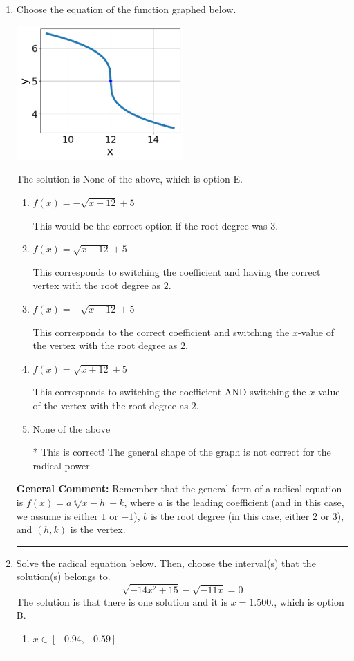 \documentclass{extbook}[14pt]
\newcommand{\litem}[1]{\item #1

\rule{\textwidth}{0.4pt}}
\begin{document}
\begin{enumerate}\litem{
Choose the equation of the function graphed below.

\begin{center}
    \includegraphics[width=0.5\textwidth]{../Figures/radicalGraphToEquationB.png}
\end{center}


The solution is \( \text{None of the above} \), which is option E.\begin{enumerate}[label=\Alph*.]
\item \( f(x) = - \sqrt{x - 12} + 5 \)

This would be the correct option if the root degree was $3$.
\item \( f(x) = \sqrt{x - 12} + 5 \)

This corresponds to switching the coefficient and having the correct vertex with the root degree as $2$.
\item \( f(x) = - \sqrt{x + 12} + 5 \)

This corresponds to the correct coefficient and switching the $x$-value of the vertex with the root degree as $2$.
\item \( f(x) = \sqrt{x + 12} + 5 \)

This corresponds to switching the coefficient AND switching the $x$-value of the vertex with the root degree as $2$.
\item \( \text{None of the above} \)

* This is correct! The general shape of the graph is not correct for the radical power.
\end{enumerate}

\textbf{General Comment:} Remember that the general form of a radical equation is $ f(x) = a \sqrt[b]{x - h} + k$, where $a$ is the leading coefficient (and in this case, we assume is either $1$ or $-1$), $b$ is the root degree (in this case, either $2$ or $3$), and $(h, k)$ is the vertex.
}
\litem{
Solve the radical equation below. Then, choose the interval(s) that the solution(s) belongs to.
\[ \sqrt{-14 x^2 + 15} - \sqrt{-11 x} = 0 \]The solution is \( \text{that there is one solution and it is } x = 1.500. \), which is option B.\begin{enumerate}[label=\Alph*.]
\item \( x \in [-0.94,-0.59] \)


\end{enumerate}}
\end{enumerate}
\end{document}
